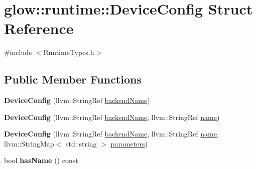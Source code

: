 \hypertarget{structglow_1_1runtime_1_1_device_config}{}\section{glow\+:\+:runtime\+:\+:Device\+Config Struct Reference}
\label{structglow_1_1runtime_1_1_device_config}


{\ttfamily \#include $<$Runtime\+Types.\+h$>$}

\subsection*{Public Member Functions}
\begin{DoxyCompactItemize}
\item 
\mbox{\label{structglow_1_1runtime_1_1_device_config_adb02f90b78f5a7e1ba27a2cb3344c269}} 
{\bfseries Device\+Config} (llvm\+::\+String\+Ref \hyperlink{structglow_1_1runtime_1_1_device_config_af0b3f3f4020ac329221ee3e635405ba3}{backend\+Name})
\item 
\mbox{\label{structglow_1_1runtime_1_1_device_config_ab9af86366ecac786863c89f75527f2af}} 
{\bfseries Device\+Config} (llvm\+::\+String\+Ref \hyperlink{structglow_1_1runtime_1_1_device_config_af0b3f3f4020ac329221ee3e635405ba3}{backend\+Name}, llvm\+::\+String\+Ref \hyperlink{structglow_1_1runtime_1_1_device_config_a70b19bb94502b91856a2dd264fb066ac}{name})
\item 
\mbox{\label{structglow_1_1runtime_1_1_device_config_a81636e08330dbd007c385789cdd96375}} 
{\bfseries Device\+Config} (llvm\+::\+String\+Ref \hyperlink{structglow_1_1runtime_1_1_device_config_af0b3f3f4020ac329221ee3e635405ba3}{backend\+Name}, llvm\+::\+String\+Ref \hyperlink{structglow_1_1runtime_1_1_device_config_a70b19bb94502b91856a2dd264fb066ac}{name}, llvm\+::\+String\+Map$<$ std\+::string $>$ \hyperlink{structglow_1_1runtime_1_1_device_config_abf420dfceeecb9303fe3b8668c9da723}{parameters})
\item 
\mbox{\label{structglow_1_1runtime_1_1_device_config_a6834c1fe0d5f61a0150cd96aca240b59}} 
bool {\bfseries has\+Name} () const
\item 

\end{DoxyCompactItemize}
